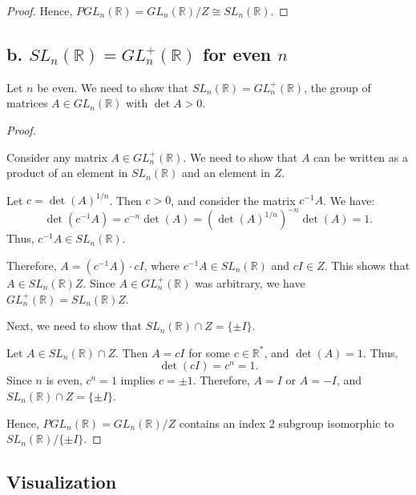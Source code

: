 \documentclass[12pt]{amsart}
\theoremstyle{definition}
\numberwithin{equation}{section}
\newcommand{\R}{\mathbb{R}}
\begin{document}
\begin{exercise}{1}
\begin{proof}
    Hence, \(PGL_n(\R) = GL_n(\R) / Z \cong SL_n(\R)\).

    \end{proof}

    \subsection*{b. \(SL_n(\R) = GL^+_n(\R)\) for even \(n\)}

    Let \(n\) be even. We need to show that \(SL_n(\R) = GL^+_n(\R)\), the group of matrices \(A \in GL_n(\R)\) with \(\det A > 0\).

    \begin{proof} \(\)

    Consider any matrix \(A \in GL^+_n(\R)\). We need to show that \(A\) can be written as a product of an element in \(SL_n(\R)\) and an element in \(Z\).

    Let \(c = \det(A)^{1/n}\). Then \(c > 0\), and consider the matrix \(c^{-1}A\). We have:
    \[
    \det(c^{-1}A) = c^{-n} \det(A) = (\det(A)^{1/n})^{-n} \det(A) = 1.
    \]
    Thus, \(c^{-1}A \in SL_n(\R)\).

    Therefore, \(A = (c^{-1}A) \cdot cI\), where \(c^{-1}A \in SL_n(\R)\) and \(cI \in Z\). This shows that \(A \in SL_n(\R)Z\). Since \(A \in GL^+_n(\R)\) was arbitrary, we have \(GL^+_n(\R) = SL_n(\R)Z\).

    Next, we need to show that \(SL_n(\R) \cap Z = \{\pm I\}\).

    Let \(A \in SL_n(\R) \cap Z\). Then \(A = cI\) for some \(c \in \R^*\), and \(\det(A) = 1\). Thus,
    \[
    \det(cI) = c^n = 1.
    \]
    Since \(n\) is even, \(c^n = 1\) implies \(c = \pm 1\). Therefore, \(A = I\) or \(A = -I\), and \(SL_n(\R) \cap Z = \{\pm I\}\).

    Hence, \(PGL_n(\R) = GL_n(\R) / Z\) contains an index 2 subgroup isomorphic to \(SL_n(\R)/\{\pm I\}\).

    \end{proof}

    \subsection*{Visualization}

    \begin{center}
    \end{center}
    
\end{exercise}
\newpage
\end{document}
